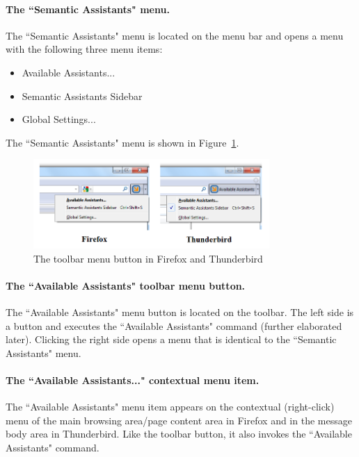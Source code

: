 \paragraph{The ``Semantic Assistants" menu.} The ``Semantic Assistants" menu is 
located on the menu bar and opens a menu with the following three menu items: 
\begin{itemize} 
  \item Available Assistants... 
  \item Semantic Assistants Sidebar 
  \item Global Settings... 
\end{itemize} 

The ``Semantic Assistants" menu is shown in Figure~\ref{fig:mozilla_features_toolbar_menu_button}. 

\begin{figure}[htb]
  \centering
  \includegraphics[width=0.8\textwidth]{pictures/mozilla_features_toolbar_menu_button.png}
  \caption{The toolbar menu button in Firefox and Thunderbird}
  \label{fig:mozilla_features_toolbar_menu_button}
\end{figure}

\paragraph{The ``Available Assistants" toolbar menu button.} The ``Available Assistants" menu button is located on the toolbar. The left side is a button and executes the ``Available Assistants" command (further elaborated later). Clicking the right side opens a menu that is identical to the ``Semantic Assistants" menu. 

\paragraph{The ``Available Assistants..." contextual menu item.} The ``Available Assistants" menu item appears on the contextual (right-click) menu of the main browsing area/page content area in Firefox and in the message body area in Thunderbird. Like the toolbar button, it also invokes the ``Available Assistants" command. 


